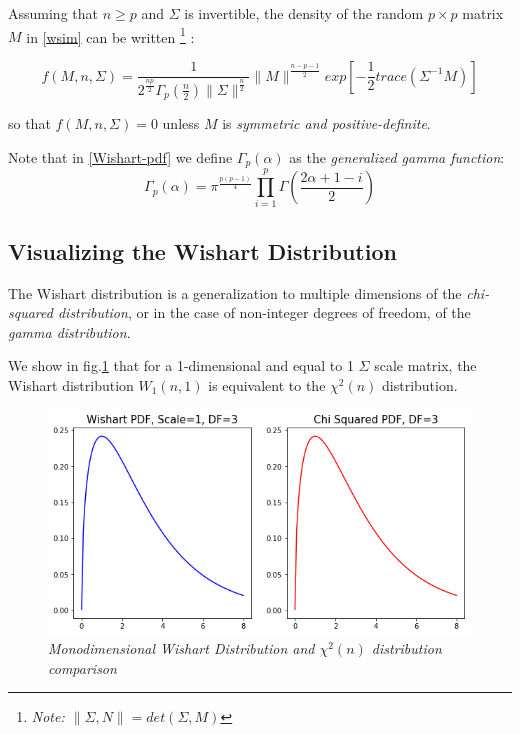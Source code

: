 \documentclass[12pt,openright,twoside,a4paper]{book}
\begin{document}
Assuming that  $n\geq p$ and $\Sigma$ is invertible, the density of the random $p\times p $ matrix $M$ in \ref{wsim} can be written \footnote{\textit{Note: $\|\Sigma , N \| = det (\Sigma , M)$}} :

\begin{equation}
f(M, n, \Sigma)=\frac{1}{2^{\frac{np}{2}}\Gamma_p(\frac{n}{2})\|\Sigma\|^{\frac{n}{2}}}\|M\|^{\frac{n-p-1}{2}}exp[-\frac{1}{2}trace(\Sigma^{-1}M)]
\label{Wishart-pdf}
\end{equation} 

so that $f(M, n, \Sigma)=0$ unless $M$ is \textit{symmetric and positive-definite}. \cite{IMS}

Note that in \ref{Wishart-pdf} we define $\Gamma_p(\alpha)$ as the \textit{generalized gamma function}:
\begin{equation}
\Gamma_p(\alpha)=\pi^\frac{p(p-1)}{4}\prod_{i=1}^p\Gamma(\frac{2\alpha+1-i}{2})
\end{equation}

\subsection{Visualizing the Wishart Distribution}

The Wishart distribution is a generalization to multiple dimensions of the \textit{chi-squared distribution}, or in the case of non-integer degrees of freedom, of the \textit{gamma distribution}.

We show in fig.\ref{Wish-chi2} that for a 1-dimensional and equal to 1 $\Sigma$ scale matrix, the Wishart distribution $W_1(n,1)$ is equivalent to the $\chi^2(n)$ distribution.

\begin{figure}[!h]
\centering
\includegraphics[scale=0.37]{wish-chi}
\caption{\textit{Monodimensional Wishart Distribution and $\chi^2(n)$ distribution comparison}}
\label{Wish-chi2}
\end{figure}
\end{document}

